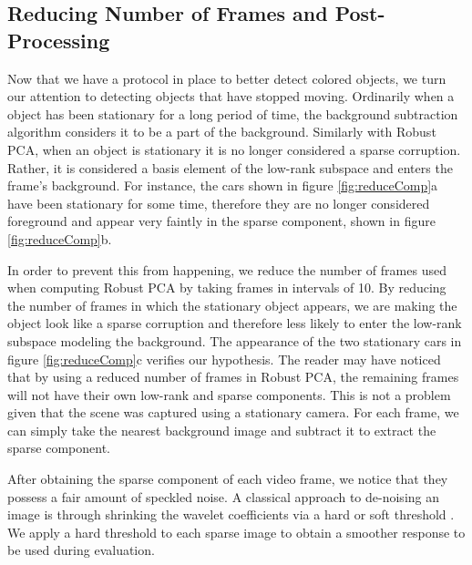 \documentclass{article}
\begin{document}
\subsection{Reducing Number of Frames and Post-Processing}

Now that we have a protocol in place to better detect colored objects, we turn our attention to detecting objects that have stopped moving. Ordinarily when a object has been stationary for a long period of time, the background subtraction algorithm considers it  to be a part of the background. Similarly with  Robust PCA, when an object is stationary it is no longer considered a sparse corruption. Rather, it is considered a basis element of the low-rank subspace and enters the frame's background. For instance, the cars shown in figure \ref{fig:reduceComp}a have been stationary for some time, therefore they are no longer considered foreground and appear very faintly in the sparse component, shown in figure \ref{fig:reduceComp}b.
 
In order to prevent this from happening, we reduce the number of frames used when computing Robust PCA by taking frames in intervals of 10. By reducing the number of frames in which the stationary object appears, we are making the object look like a sparse corruption and therefore less likely to enter the low-rank subspace modeling the background. The appearance of the two stationary cars in figure \ref{fig:reduceComp}c verifies our hypothesis. The reader may have noticed that by using a reduced number of frames in Robust PCA, the remaining frames will not have their own low-rank and sparse components. This is not a problem given that the scene was captured using a stationary camera. For each frame, we can simply take the nearest background image and subtract it to extract the sparse component.

After obtaining the sparse component of each video frame, we notice that they possess a fair amount of speckled noise. A classical approach to de-noising an image is through shrinking the wavelet coefficients via a hard or soft threshold \cite{Donoho95}. We apply a hard threshold to each sparse image to obtain a smoother response to be used during evaluation.
\end{document}
